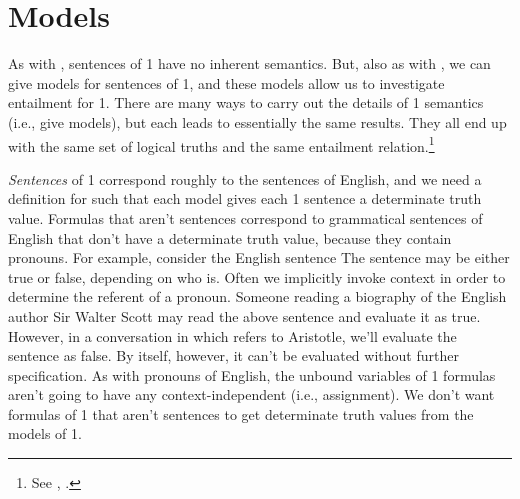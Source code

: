 \section{Models}\label{GQL1 Interpretations}

As with \GSL{}, sentences of \GQL{}1 have no inherent semantics.  
But, also as with \GSL{}, we can give models for sentences of \GQL{}1, and these models allow us to investigate entailment for \GQL{}1.  There are many ways to carry out the details of \GQL{}1 semantics (i.e., give models), but each leads to essentially the same results.  They all end up with the same set of logical truths and the same entailment relation.\footnote{See \citealt[49ff]{Hodges2001}, \citeyear{Hodges1997}.}

\emph{Sentences} of \GQL{}1 correspond roughly to the sentences of English, and we need a definition for  such that each model gives each \GQL{}1 sentence a determinate truth value.   Formulas that aren't sentences correspond to grammatical sentences of English that don't have a determinate truth value, because they contain pronouns. For example, consider the English sentence   The sentence may be either true or false, depending on who  is.  Often we implicitly invoke context in order to determine the referent of a pronoun. Someone reading a biography of the English author Sir Walter Scott may read the above sentence and evaluate it as true.  However, in a conversation in which  refers to Aristotle, we'll evaluate the sentence as false.  By itself, however, it can't be evaluated without further specification.  As with pronouns of English, the unbound variables of \GQL{}1 formulas aren't going to have any context-independent  (i.e., assignment).  We don't want formulas of \GQL{}1 that aren't sentences to get determinate truth values from the models of \GQL{}1.  

